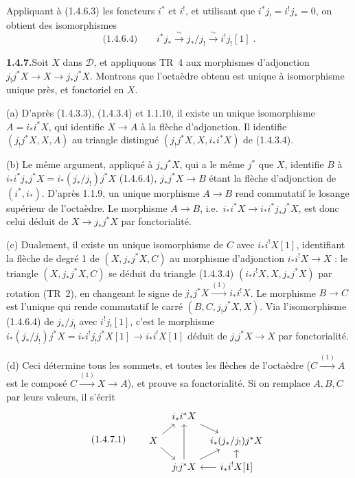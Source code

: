 \documentclass[12pt,a4paper]{article}
\theoremstyle{plain}
\theoremstyle{definition}
\begin{document}
Appliquant \`a (1.4.6.3) les foncteurs $i^*$ et $i^!$, et utilisant que $i^*j_! = i^!j_* = 0$, on obtient des isomorphismes
\[
\text{(1.4.6.4)}\qquad i^*j_* \xrightarrow{\;\sim\;} j_*/j_! \xrightarrow{\;\sim\;} i^!j_![1]\;.
\]

\smallskip
\noindent\textbf{1.4.7.}\quad Soit $X$ dans $\mathcal{D}$, et appliquons TR~4 aux morphismes d'adjonction $j_!j^*X \to X \to j_*j^*X$. Montrons que l'octa\`edre obtenu est unique \`a isomorphisme unique pr\`es, et fonctoriel en $X$.

(a) D'apr\`es (1.4.3.3), (1.4.3.4) et 1.1.10, il existe un unique isomorphisme $A = i_*i^*X$, qui identifie $X \to A$ \`a la fl\`eche d'adjonction. Il identifie $(j_!j^*X, X, A)$ au triangle distingu\'e $(j_!j^*X, X, i_*i^*X)$ de (1.4.3.4).

(b) Le m\^eme argument, appliqu\'e \`a $j_*j^*X$, qui a le m\^eme $j^*$ que $X$, identifie $B$ \`a $i_*i^*j_*j^*X = i_*(j_*/j_!)j^*X$ (1.4.6.4), $j_*j^*X \to B$ \'etant la fl\`eche d'adjonction de $(i^*, i_*)$. D'apr\`es 1.1.9, un unique morphisme $A \to B$ rend commutatif le losange sup\'erieur de l'octa\`edre. Le morphisme $A \to B$, i.e.\ $i_*i^*X \to i_*i^*j_*j^*X$, est donc celui d\'eduit de $X \to j_*j^*X$ par fonctorialit\'e.

(c) Dualement, il existe un unique isomorphisme de $C$ avec $i_*i^!X[1]$, identifiant la fl\`eche de degr\'e 1 de $(X, j_*j^*X, C)$ au morphisme d'adjonction $i_*i^!X \to X$ : le triangle $(X, j_*j^*X, C)$ se d\'eduit du triangle (1.4.3.4) $(i_*i^!X, X, j_*j^*X)$ par rotation (TR~2), en changeant le signe de $j_*j^*X \xrightarrow{(1)} i_*i^!X$. Le morphisme $B \to C$ est l'unique qui rende commutatif le carr\'e $(B, C, j_!j^*X, X)$. Via l'isomorphisme (1.4.6.4) de $j_*/j_!$ avec $i^!j_![1]$, c'est le morphisme $i_*(j_*/j_!)j^*X = i_*i^!j_!j^*X[1] \to i_*i^!X[1]$ d\'eduit de $j_!j^*X \to X$ par fonctorialit\'e.

(d) Ceci d\'etermine tous les sommets, et toutes les fl\`eches de l'octa\`edre ($C \xrightarrow{(1)} A$ est le compos\'e $C \xrightarrow{(1)} X \to A$), et prouve sa fonctorialit\'e. Si on remplace $A, B, C$ par leurs valeurs, il s'\'ecrit
\[
\text{(1.4.7.1)}\qquad
\begin{tikzcd}[column sep=tiny, row sep=small]
& i_*i^*X \arrow[dr] \\
X \arrow[ur] \arrow[dr] && i_*(j_*/j_!)j^*X \arrow[dl] \\
& j_!j^*X \arrow[uu, crossing over] \arrow[ur, crossing over] & i_*i^!X[1] \arrow[l] \arrow[u]
\end{tikzcd}
\]
\end{document}
